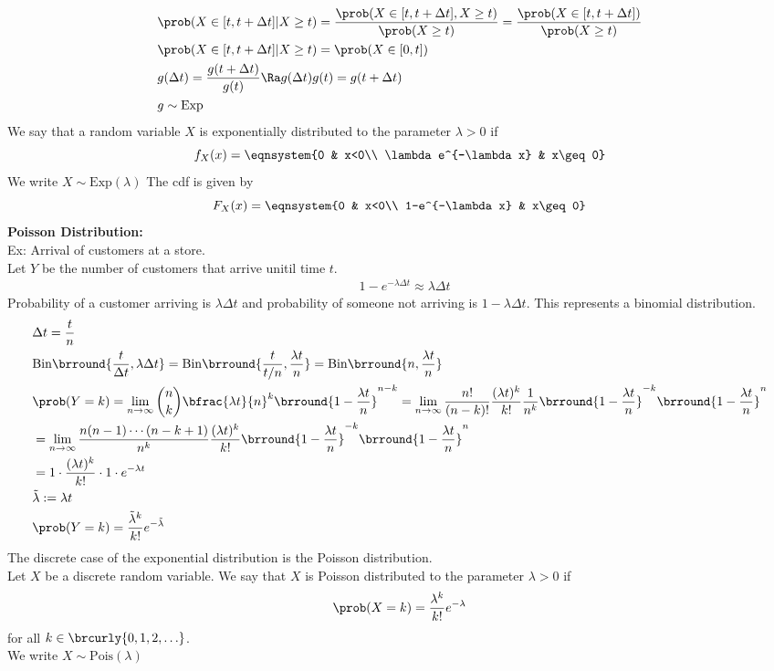 \begin{align*}
    &\prob(X\in[t,t+\Delta t]|X\geq t)=\frac{\prob(X\in[t,t+\Delta t], X\geq t)}{\prob(X\geq t)}=\frac{\prob(X\in[t,t+\Delta t])}{\prob(X\geq t)}\\
    &\prob(X\in[t,t+\Delta t]|X\geq t)=\prob(X\in[0,t])\\
    &g(\Delta t)=\frac{g(t+\Delta t)}{g(t)}\Ra g(\Delta t)g(t)=g(t+\Delta t)\\
    &g\sim\mathrm{Exp}
\end{align*}
We say that a random variable $X$ is exponentially distributed to the parameter $\lambda>0$ if
\[f_X(x)=\eqnsystem{0 & x<0\\ \lambda e^{-\lambda x} & x\geq 0}\]
We write $X\sim\mathrm{Exp}(\lambda)$
The cdf is given by
\[F_X(x)=\eqnsystem{0 & x<0\\ 1-e^{-\lambda x} & x\geq 0}\]
\textbf{Poisson Distribution:}\\
Ex: Arrival of customers at a store.\\
Let $Y$ be the number of customers that arrive unitil time $t$.
\begin{align*}
    &1-e^{-\lambda\Delta t}\approx\lambda\Delta t
\end{align*}
Probability of a customer arriving is $\lambda\Delta t$ and probability of someone not arriving is $1-\lambda\Delta t$. This represents a binomial distribution.
\begin{align*}
    &\Delta t=\frac{t}{n}\\
    &\mathrm{Bin}\brround{\frac{t}{\Delta t},\lambda\Delta t}=\mathrm{Bin}\brround{\frac{t}{t/n},\frac{\lambda t}{n}}=\mathrm{Bin}\brround{n,\frac{\lambda t}{n}}\\
    &\prob(Y=k)=\lim_{n\to\infty}\binom{n}{k}\bfrac{\lambda t}{n}^k\brround{1-\frac{\lambda t}{n}}^{n-k}=\lim_{n\to\infty}\frac{n!}{(n-k)!}\frac{(\lambda t)^k}{k!}\frac{1}{n^k}\brround{1-\frac{\lambda t}{n}}^{-k}\brround{1-\frac{\lambda t}{n}}^n\\
    &=\lim_{n\to\infty}\frac{n(n-1)\cdots(n-k+1)}{n^k}\frac{(\lambda t)^k}{k!}\brround{1-\frac{\lambda t}{n}}^{-k}\brround{1-\frac{\lambda t}{n}}^n\\
    &=1\cdot\frac{(\lambda t)^k}{k!}\cdot 1\cdot e^{-\lambda t}\\
    &\tilde{\lambda}:=\lambda t\\
    &\prob(Y=k)=\frac{\tilde{\lambda}^k}{k!}e^{-\tilde{\lambda}}
\end{align*}
The discrete case of the exponential distribution is the Poisson distribution.\\
Let $X$ be a discrete random variable. We say that $X$ is Poisson distributed to the parameter $\lambda>0$ if
\[\prob(X=k)=\frac{\lambda^k}{k!}e^{-\lambda}\]
for all $k\in\brcurly{0,1,2,\ldots}$.\\
We write $X\sim\mathrm{Pois}(\lambda)$


